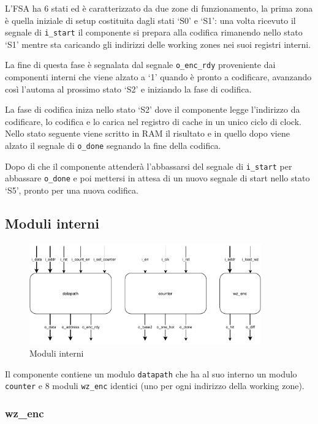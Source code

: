 \documentclass[a4paper]{article}
\begin{document}
L'FSA ha 6 stati ed è caratterizzato da due zone di funzionamento, la prima zona è quella iniziale di setup costituita dagli stati `S0' e `S1': una volta ricevuto il segnale di \texttt{i\_start} il componente si prepara alla codifica rimanendo nello stato `S1' mentre sta caricando gli indirizzi delle working zones nei suoi registri interni.

La fine di questa fase è segnalata dal segnale \texttt{o\_enc\_rdy} proveniente dai componenti interni che viene alzato a `1' quando è pronto a codificare, avanzando così l'automa al prossimo stato `S2' e iniziando la fase di codifica.

La fase di codifica iniza nello stato `S2' dove il componente legge l'indirizzo da codificare, lo codifica e lo carica nel registro di cache in un unico ciclo di clock. Nello stato seguente viene scritto in RAM il risultato e in quello dopo viene alzato il segnale di \texttt{o\_done} segnando la fine della codifica.

Dopo di che il componente attenderà l'abbassarsi del segnale di \texttt{i\_start} per abbassare \texttt{o\_done} e poi mettersi in attesa di un nuovo segnale di start nello stato `S5', pronto per una nuova codifica.

\subsection{Moduli interni}

\begin{figure}[H]
  \centering
  \includegraphics[width=10cm]{schema-components.pdf}
  \caption{Moduli interni}
\end{figure}

Il componente contiene un modulo \texttt{datapath} che ha al suo interno un modulo \texttt{counter} e 8 moduli \texttt{wz\_enc} identici (uno per ogni indirizzo della working zone).

\subsubsection{wz\_enc}
\end{document}
